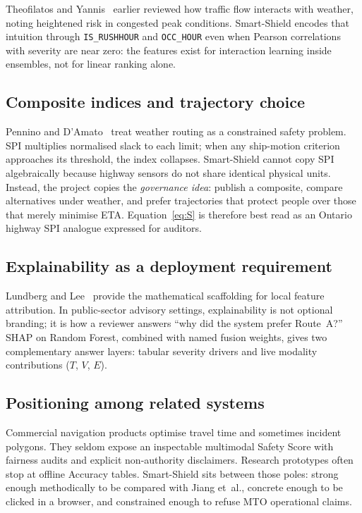 \documentclass[11pt,a4paper]{article}
\begin{document}
Theofilatos and Yannis~\citep{theofilatos2014} earlier reviewed how traffic flow interacts with weather, noting heightened risk in congested peak conditions. Smart-Shield encodes that intuition through \texttt{IS\_RUSHHOUR} and \texttt{OCC\_HOUR} even when Pearson correlations with severity are near zero: the features exist for interaction learning inside ensembles, not for linear ranking alone.

\subsection{Composite indices and trajectory choice}
Pennino and D'Amato~\citep{pennino2024weather} treat weather routing as a constrained safety problem. SPI multiplies normalised slack to each limit; when any ship-motion criterion approaches its threshold, the index collapses. Smart-Shield cannot copy SPI algebraically because highway sensors do not share identical physical units. Instead, the project copies the \emph{governance idea}: publish a composite, compare alternatives under weather, and prefer trajectories that protect people over those that merely minimise ETA. Equation~\eqref{eq:S} is therefore best read as an Ontario highway SPI analogue expressed for auditors.

\subsection{Explainability as a deployment requirement}
Lundberg and Lee~\citep{lundberg2017shap} provide the mathematical scaffolding for local feature attribution. In public-sector advisory settings, explainability is not optional branding; it is how a reviewer answers ``why did the system prefer Route~A?'' SHAP on Random Forest, combined with named fusion weights, gives two complementary answer layers: tabular severity drivers and live modality contributions ($T$, $V$, $E$).

\subsection{Positioning among related systems}
Commercial navigation products optimise travel time and sometimes incident polygons. They seldom expose an inspectable multimodal Safety Score with fairness audits and explicit non-authority disclaimers. Research prototypes often stop at offline Accuracy tables. Smart-Shield sits between those poles: strong enough methodically to be compared with Jiang et~al., concrete enough to be clicked in a browser, and constrained enough to refuse MTO operational claims.
\end{document}
